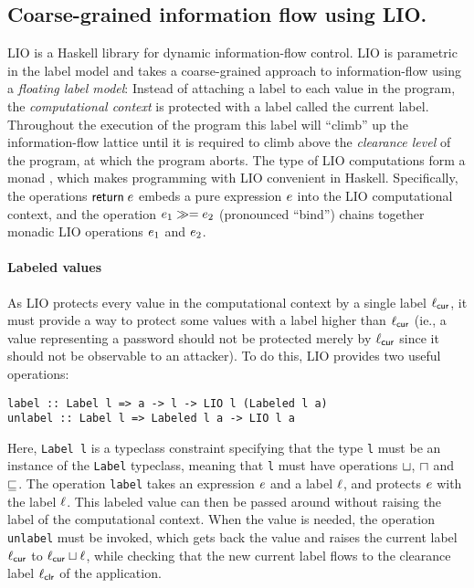 \subsection{Coarse-grained information flow using LIO.}
LIO \cite{SRMMlio} is a Haskell library for dynamic information-flow control. LIO is parametric in the label model and takes a coarse-grained approach to information-flow using a \emph{floating label model}: Instead of attaching a label to each value in the program, the \emph{computational context} is protected with a label called the current label. Throughout the execution of the program this label will ``climb'' up the information-flow lattice until it is required to climb above the \emph{clearance level} of the program, at which the program aborts. The type of LIO computations form a monad \cite{Wadler:1995:MFP:647698.734146}, which makes programming with LIO convenient in Haskell. Specifically, the operations $\mathsf{return}\;e$ embeds a pure expression $e$ into the LIO computational context, and the operation $e_1 \gg= e_2$ (pronounced ``bind'') chains together monadic LIO operations $e_1$ and $e_2$.

\paragraph{Labeled values}
As LIO protects every value in the computational context by a single label $\ell_{\mathsf{cur}}$, it must provide a way to protect some values with a label higher than $\ell_{\mathsf{cur}}$ (ie., a value representing a password should not be protected merely by $\ell_{\mathsf{cur}}$ since it should not be observable to an attacker). To do this, LIO provides two useful operations:
\begin{verbatim}
label :: Label l => a -> l -> LIO l (Labeled l a)
unlabel :: Label l => Labeled l a -> LIO l a
\end{verbatim}
Here, \texttt{Label l} is a typeclass constraint specifying that the type \texttt{l} must be an instance of the \texttt{Label} typeclass, meaning that \texttt{l} must have operations $\sqcup$, $\sqcap$ and $\sqsubseteq$. The operation \texttt{label} takes an expression $e$ and a label $\ell$, and protects $e$ with the label $\ell$. This labeled value can then be passed around without raising the label of the computational context. When the value is needed, the operation \texttt{unlabel} must be invoked, which gets back the value and raises the current label $\ell_{\mathsf{cur}}$ to $\ell_{\mathsf{cur}} \sqcup \ell$, while checking that the new current label flows to the clearance label $\ell_{\mathsf{clr}}$ of the application.

